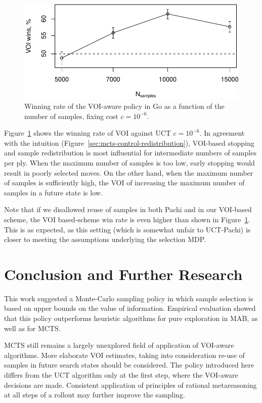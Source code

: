 \begin{figure}[h!]
\centering
\includegraphics[scale=0.55]{mcts-voi-wins.pdf}
\caption{Winning rate of the VOI-aware policy in Go as a function of the number of samples, fixing cost $c=10^{-6}$.}
\label{fig:voi-wins}
\end{figure}

Figure~\ref{fig:voi-wins}
shows the winning rate of VOI against UCT $c=10^{-6}$. In agreement with the intuition
(Figure~\ref{sec:mcts-control-redistribution}), VOI-based stopping and
sample redistribution is most influential for intermediate numbers of
samples per ply. When the maximum number of samples is too low, early
stopping would result in poorly selected moves. On the other hand,
when the maximum number of samples is sufficiently high, the VOI of
increasing the maximum number of samples in a future state is low.

Note that if we disallowed reuse of samples in both Pachi and
in our VOI-based scheme, the VOI based-scheme
win rate is even higher than shown in Figure~\ref{fig:voi-wins}. This is as expected,
as this setting (which is somewhat unfair to UCT-Pachi) is closer to
meeting the assumptions underlying the selection MDP.

\section{Conclusion and Further Research}

This work suggested a Monte-Carlo sampling policy in which sample
selection is based on upper bounds on the value of
information. Empirical evaluation showed that this policy outperforms
heuristic algorithms for pure exploration in MAB, as well as for MCTS.

MCTS still remains a largely unexplored field of
application of VOI-aware algorithms. More elaborate VOI estimates,
taking into consideration re-use of samples in future search states
should be considered. The policy introduced here differs from
the UCT algorithm only at the first step, where the VOI-aware
decisions are made. Consistent application of principles of rational
metareasoning at all steps of a rollout may further improve the
sampling.

